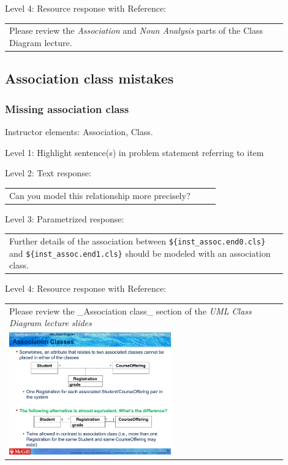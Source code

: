 \noindent Level 4: Resource response with Reference: \medskip

\begin{tabular}{|p{0.9\linewidth}}
Please review the \textit{Association} and \textit{Noun Analysis} parts of the Class Diagram lecture.
\end{tabular} \medskip


\subsection{Association class mistakes}

\subsubsection{Missing association class}

Instructor elements: Association, Class. \medskip

\noindent Level 1: Highlight sentence(s) in problem statement referring to item \medskip

\noindent Level 2: Text response: \medskip

\begin{tabular}{|p{0.9\linewidth}}
Can you model this relationship more precisely?
\end{tabular} \medskip

\noindent Level 3: Parametrized response: \medskip

\begin{tabular}{|p{0.9\linewidth}}
Further details of the association between \verb|${inst_assoc.end0.cls}| and \verb|${inst_assoc.end1.cls}| should be modeled with an association class.
\end{tabular} \medskip

\noindent Level 4: Resource response with Reference: \medskip

\begin{tabular}{|p{0.9\linewidth}}
Please review the _Association class_ section of the
\textit{UML Class Diagram lecture slides}

\\
\includegraphics[width=0.6\textwidth]{images/association_class.png}
\end{tabular} \medskip


